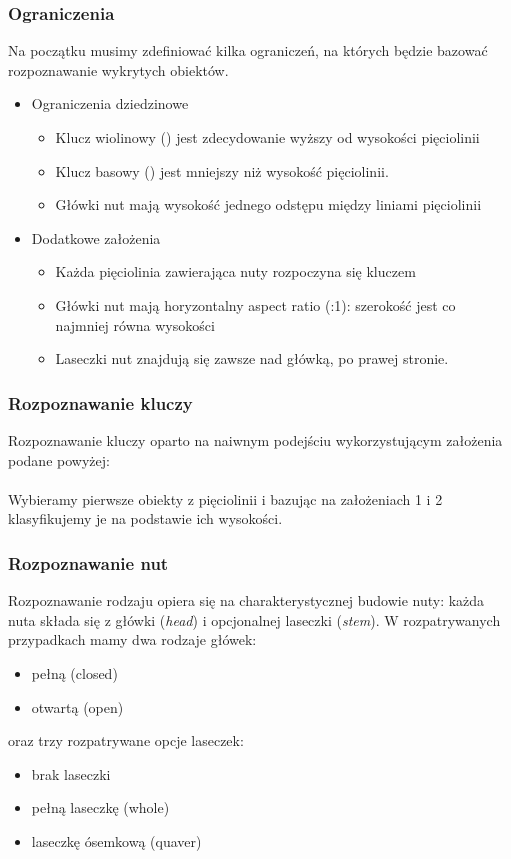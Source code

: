 \documentclass[12pt, letterpaper]{article}
\begin{document}
\subsubsection{Ograniczenia}
Na początku musimy zdefiniować kilka ograniczeń, na których będzie bazować
rozpoznawanie wykrytych obiektów.
\begin{itemize}
    \item Ograniczenia dziedzinowe
          \begin{itemize}
              \item Klucz wiolinowy (\clefG) jest zdecydowanie wyższy od wysokości pięciolinii
              \item Klucz basowy (\clefF) jest mniejszy niż wysokość pięciolinii.
              \item Główki nut mają wysokość jednego odstępu między liniami pięciolinii
          \end{itemize}

    \item Dodatkowe założenia
          \begin{itemize}
              \item Każda pięciolinia zawierająca nuty rozpoczyna się kluczem
              \item Główki nut mają horyzontalny aspect ratio (:1): szerokość jest co najmniej równa wysokości
              \item Laseczki nut znajdują się zawsze nad główką, po prawej stronie.
          \end{itemize}
\end{itemize}


\subsubsection{Rozpoznawanie kluczy}
Rozpoznawanie kluczy oparto na naiwnym podejściu wykorzystującym
założenia podane powyżej:
\\\\
Wybieramy pierwsze obiekty z pięciolinii i bazując na założeniach
1 i 2 klasyfikujemy je na podstawie ich wysokości.

\subsubsection{Rozpoznawanie nut}
Rozpoznawanie rodzaju opiera się na charakterystycznej budowie nuty:
każda nuta składa się z główki (\textit{head}) i opcjonalnej laseczki (\textit{stem}).
W rozpatrywanych przypadkach mamy dwa rodzaje główek:
\begin{itemize}
    \item pełną (closed)
    \item otwartą (open)
\end{itemize}
oraz trzy rozpatrywane opcje laseczek:
\begin{itemize}
    \item brak laseczki
    \item pełną laseczkę (whole)
    \item laseczkę ósemkową (quaver)
\end{itemize}
\end{document}
